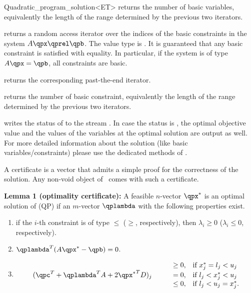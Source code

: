 \begin{ccRefClass}{Quadratic_program_solution<ET>}
{returns the number of basic variables, equivalently the length
of the range determined by the previous two iterators.}

\ccExample
{}

{returns a random access iterator over the indices of the basic
constraints in the system $A\qpx\qprel \qpb$. The value type is . 
It is guaranteed that any basic constraint is satisfied with equality.
In particular, if the system is of type $A\qpx=\qpb$, all constraints are
basic.}

{returns the corresponding past-the-end iterator.}

{returns the number of basic constraint, equivalently the length
of the range determined by the previous two iterators.}

\ccExample
{}


{writes the status of  to the stream . In case the
status is , the optimal objective value and the values
of the variables at the optimal solution are output as well. For more
detailed information about the solution (like basic variables/constraints) 
please use the dedicated methods of .}

\begin{ccAdvanced}

A certificate is a vector that admits a simple proof for the 
correctness of the solution. Any non-void object of \ccRefName\ 
comes with such a certificate.

{\bf Lemma 1 (optimality certificate):} A feasible $n$-vector $\qpx^*$ 
is an optimal solution of (QP) if an $m$-vector $\qplambda$ with the
following properties exist.
\begin{enumerate}
\item if the $i$-th constraint is of type $\leq$ ($\geq$, respectively), 
then $\lambda_i\geq 0$ ($\lambda_i\leq 0$, respectively).
\item $\qplambda^T(A\qpx^*-\qpb) = 0$.
\item \[
\begin{array}{llll}
&&\geq 0, & \mbox{if $x^*_j = l_j < u_j$} \\
(\qpc^T + \qplambda^T A + 2{\qpx^*}^TD)_j& \quad  &= 0, & \mbox{if $l_j < x^*_j < u_j$} \\
&&\leq 0, & \mbox{if $l_j < u_j = x^*_j$.}
\end{array}\]
\end{enumerate}


\end{ccAdvanced}
\end{ccRefClass}
